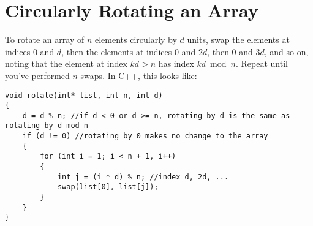 \documentclass[a4paper]{article}
\begin{document}
\section{Circularly Rotating an Array}
To rotate an array of $n$ elements circularly by $d$ units, swap the elements at indices 0 and $d$, then the elements at indices 0 and $2d$, then 0 and $3d$, and so on, noting that the element at index $kd > n$ has index $kd\bmod{n}$. Repeat until you've performed $n$ swaps. In C++, this looks like:
\begin{verbatim}
void rotate(int* list, int n, int d)
{
	d = d % n; //if d < 0 or d >= n, rotating by d is the same as rotating by d mod n
	if (d != 0) //rotating by 0 makes no change to the array
	{
		for (int i = 1; i < n + 1, i++)
		{
			int j = (i * d) % n; //index d, 2d, ...
			swap(list[0], list[j]);
		}
	}
}
\end{verbatim}
\end{document}

